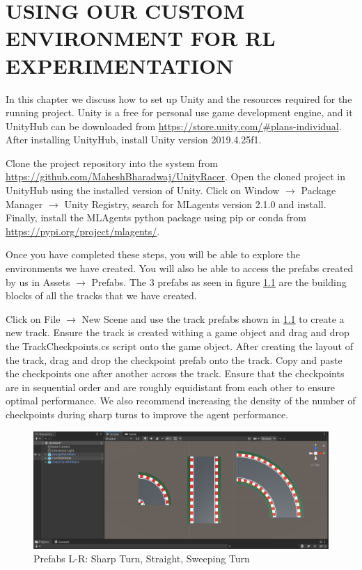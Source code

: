 \chapter{USING OUR CUSTOM ENVIRONMENT FOR RL EXPERIMENTATION}

In this chapter we discuss how to set up Unity and the resources required for the running project. Unity is a free for personal use game development engine, and it UnityHub can be downloaded from  \href{https://store.unity.com/#plans-individual}{https://store.unity.com/#plans-individual}. After installing UnityHub, install Unity version 2019.4.25f1.

Clone the project repository into the system from \href{https://github.com/MaheshBharadwaj/UnityRacer}{https://github.com/MaheshBharadwaj/UnityRacer}.
Open the cloned project in UnityHub using the installed version of Unity. Click on Window $\rightarrow$ Package Manager $\rightarrow$ Unity Registry, search for MLagents version 2.1.0 and install. Finally, install the MLAgents python package using pip or conda from \href{https://pypi.org/project/mlagents/}{https://pypi.org/project/mlagents/}.

Once you have completed these steps, you will be able to explore the environments we have created. You will also be able to access the prefabs created by us in Assets $\rightarrow$ Prefabs. The 3 prefabs as seen in figure \ref{fig:prefabs} are the building blocks of all the tracks that we have created. 

Click on File $\rightarrow$ New Scene and use the track prefabs shown in \ref{fig:prefabs} to create a new track. Ensure the track is created withing a game object and drag and drop the TrackCheckpoints.cs script onto the game object. After creating the layout of the track, drag and drop the checkpoint prefab onto the track. Copy and paste the checkpoints one after another across the track. Ensure that the checkpoints are in sequential order and are roughly equidistant from each other to ensure optimal performance. We also recommend increasing the density of the number of checkpoints during sharp turns to improve the agent performance.
 
\begin{figure}[H]
    \centering
    \includegraphics[width=1.0\textwidth]{images/Appendix_scene_prefabs.png}
    \caption{Prefabs L-R: Sharp Turn, Straight, Sweeping Turn}
    \label{fig:prefabs}
\end{figure}

